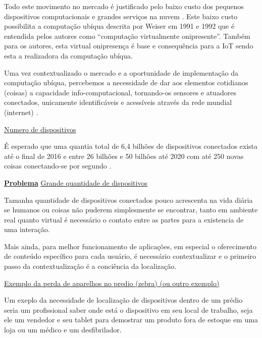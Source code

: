 \documentclass[
	12pt,				%
	openright,			%
	oneside,			%
	a4paper,			%
	chapter=TITLE,		%
	english,			%
	french,				%
	spanish,			%
	brazil				%
	]{abntex2}
\begin{document}
{Todo este movimento no mercado é justificado pelo baixo custo dos pequenos
dispositivos computacionais \cite{RpiZeroLaunch} \cite{Esp8266.net} e grandes
serviços na nuvem \cite{Kaufmann2015} \cite{Amazon2016}. Este baixo custo
possibilita a computação ubíqua descrita por Weiser em 1991 e 1992
\cite{Weiser1999} que é entendida pelos autores como ``computação virtualmente
onipresente''. Também para os autores, esta virtual onipresença é base e
consequência para a IoT sendo esta a realizadora da computação ubíqua.

Uma vez contextualizado o mercado e a oportunidade de implementação da
computação ubíqua, percebemos a necessidade de dar aos elementos cotidianos
(coisas) a capacidade info-computacional, tornando-os sensores e atuadores
conectados, unicamente identificáveis e acessíveis através da rede mundial
(internet) \cite{Lemos2013} \cite{Kranenburg2012}.

\underline{Numero de dispositivos}

É esperado que uma quantia total de 6,4 bilhões de dispositivos conectados
exista até o final de 2016 \cite{GARTNER2015} e entre 26 bilhões
\cite{GARTNER2014}  e 50 bilhões até 2020 com até 250 novas coisas conectando-se
por segundo \cite{CiscoBlog2013}.


\textbf{\underline{Problema}}
\underline{Grande quantidade de dispositivos}

Tamanha quantidade de dispositivos conectados pouco acrescenta na vida diária se
humanos ou coisas não puderem simplesmente se encontrar, tanto em ambiente real
quanto virtual é necessário o contato entre as partes para a existencia de uma
interação.

Mais ainda, para melhor funcionamento de aplicações, em especial o oferecimento
de conteúdo específico para cada usuário, é necessário contextualizar e o
primeiro passo da contextualização é a conciência da localização.

\underline{Exemplo da perda de aparelhos no predio (zebra) (ou outro exemplo)}

Um exeplo da necessidade de localização de dispositivos dentro de um prédio
seria um profissional saber onde está o dispositivo em seu local de trabalho,
seja ele um vendedor e seu tablet para demostrar um produto fora de estoque em
uma loja ou um médico e um desfibrilador.






}
\end{document}
